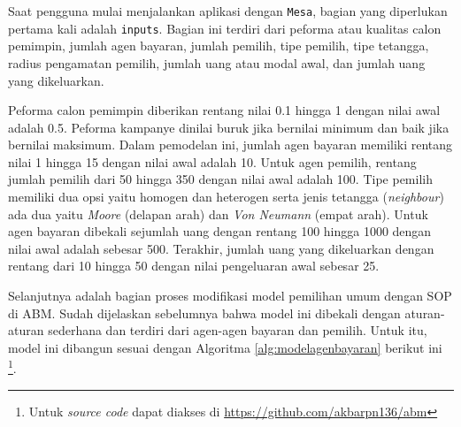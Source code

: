 Saat pengguna mulai menjalankan aplikasi dengan  \texttt{Mesa}, bagian yang diperlukan pertama kali adalah \texttt{inputs}. Bagian ini terdiri dari peforma atau kualitas calon pemimpin, jumlah agen bayaran, jumlah pemilih, tipe pemilih, tipe tetangga, radius pengamatan pemilih, jumlah uang atau modal awal, dan jumlah uang yang dikeluarkan.

Peforma calon pemimpin diberikan rentang nilai 0.1 hingga 1 dengan nilai awal adalah 0.5. Peforma kampanye dinilai buruk jika bernilai minimum dan baik jika bernilai maksimum. Dalam pemodelan ini, jumlah agen bayaran memiliki rentang nilai 1 hingga 15 dengan nilai awal adalah 10. Untuk agen pemilih, rentang jumlah pemilih dari 50 hingga 350 dengan nilai awal adalah 100. Tipe pemilih memiliki dua opsi yaitu homogen dan heterogen serta jenis tetangga (\textit{neighbour}) ada dua yaitu \textit{Moore} (delapan arah) dan \textit{Von Neumann} (empat arah). Untuk agen bayaran dibekali sejumlah uang dengan rentang 100 hingga 1000 dengan nilai awal adalah sebesar 500. Terakhir, jumlah uang yang dikeluarkan dengan rentang dari 10 hingga 50 dengan nilai pengeluaran awal sebesar 25.

Selanjutnya adalah bagian proses modifikasi model pemilihan umum dengan SOP di ABM. Sudah dijelaskan sebelumnya bahwa model ini dibekali dengan aturan-aturan sederhana dan terdiri dari agen-agen bayaran dan pemilih. Untuk itu, model ini dibangun sesuai dengan Algoritma \ref{alg:modelagenbayaran} berikut ini \footnote{Untuk \textit{source code} dapat diakses di \url{https://github.com/akbarpn136/abm}}.

